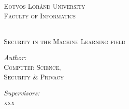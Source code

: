 

\begin{titlepage}
	\begin{center}
		
		\begin{minipage}{0.3\textwidth}
		\end{minipage} \hfill
		\begin{minipage}{0.65\textwidth}
			\begin{flushright}
				\textsc{\Large Eötvös Loránd University} \\
				\textsc{\large Faculty of Informatics}
			\end{flushright}
		\end{minipage}
		\\[3cm]
		
		{\huge \vspace{0.5cm} \textsc{Security in the Machine Learning field  \\[3cm] }}
		
		\begin{minipage}{0.43\textwidth}
			\begin{flushleft} \large	
				\emph{Author:}\\
				\textsc{ \small Computer Science, \\\hspace{0cm}Security \& Privacy  \\\hspace{0cm}} %
			\end{flushleft}
		\end{minipage}
		\begin{minipage}{0.56\textwidth}
			\begin{flushright} \large
				\emph{Supervisors:} \\
				\textsc{xxx} %
			\end{flushright}
		\end{minipage}\\[1cm]
			\begin{minipage}{0.37\textwidth}
				\begin{flushleft} \large	
					
				\end{flushleft}
			\end{minipage}
			\begin{minipage}{0.62\textwidth}
				\begin{flushright} \large
					

\end{flushright}
\end{minipage}
\end{center}
\end{titlepage}
